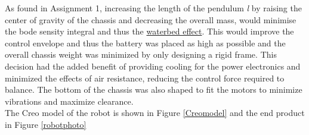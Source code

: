 \documentclass{UoNMCHA}
\numberwithin{equation}{section}
\begin{document}
As found in Assignment 1, increasing the length of the pendulum \textit{l} by raising the center of gravity of the chassis and decreasing the overall mass, would minimise the bode sensity integral and thus the \href{https://tinyurl.com/y7e8eue4}{waterbed effect}. This would improve the control envelope and  thus the battery was placed as high as possible and the overall chassis weight was minimized by only designing a rigid frame. This decision had the added benefit of providing cooling for the power electronics and minimized the effects of air resistance, reducing the control force required to balance. The bottom of the chassis was also shaped to fit the motors to minimize vibrations and maximize clearance. \\

The Creo model of the robot is shown in Figure \ref{Creomodel} and the end product in Figure \ref{robotphoto}
\end{document}

